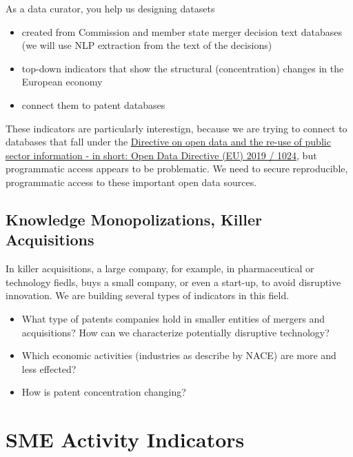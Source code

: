 \documentclass[
  a4paper,
  openany, a4paper, oneside]{book}
\providecommand{\tightlist}{%
  \setlength{\itemsep}{0pt}\setlength{\parskip}{0pt}}
\begin{document}
As a data curator, you help us designing datasets

\begin{itemize}
\tightlist
\item
  created from Commission and member state merger decision text databases (we will use NLP extraction from the text of the decisions)
\item
  top-down indicators that show the structural (concentration) changes in the European economy
\item
  connect them to patent databases
\end{itemize}

These indicators are particularly interestign, because we are trying to connect to databases that fall under the \href{https://eur-lex.europa.eu/legal-content/EN/TXT/?qid=1561563110433\&uri=CELEX:32019L1024}{Directive on open data and the re-use of public sector information - in short: Open Data Directive (EU) 2019 / 1024}, but programmatic access appears to be problematic. We need to secure reproducible, programmatic access to these important open data sources.

\hypertarget{knowledge-monopoly}{%
\subsection{Knowledge Monopolizations, Killer Acquisitions}\label{knowledge-monopoly}}

In killer acquisitions, a large company, for example, in pharmaceutical or technology fiedls, buys a small company, or even a start-up, to avoid disruptive innovation. We are building several types of indicators in this field.

\begin{itemize}
\tightlist
\item
  What type of patents companies hold in smaller entities of mergers and acquisitions? How can we characterize potentially disruptive technology?
\item
  Which economic activities (industries as describe by NACE) are more and less effected?
\item
  How is patent concentration changing?
\end{itemize}

\hypertarget{sme-indicators}{%
\section{SME Activity Indicators}\label{sme-indicators}}
\end{document}
